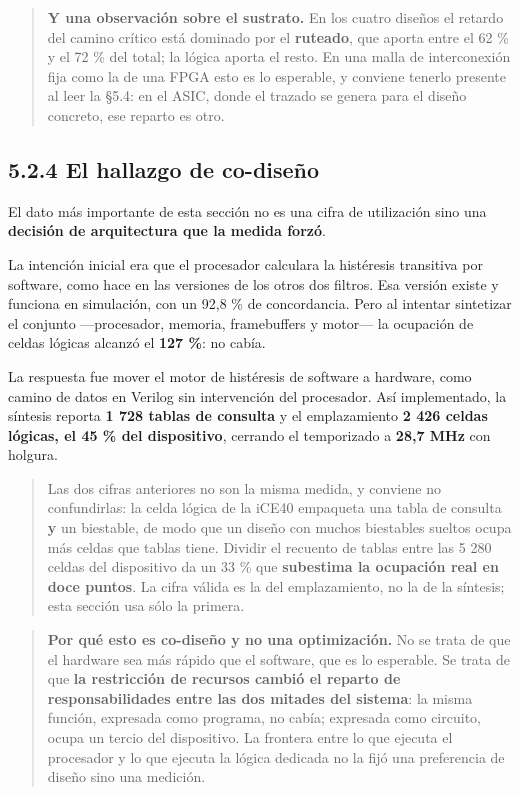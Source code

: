\begin{quote}
\textbf{Y una observación sobre el sustrato.} En los cuatro diseños el
retardo del camino crítico está dominado por el \textbf{ruteado}, que
aporta entre el 62 \% y el 72 \% del total; la lógica aporta el resto.
En una malla de interconexión fija como la de una FPGA esto es lo
esperable, y conviene tenerlo presente al leer la §5.4: en el ASIC,
donde el trazado se genera para el diseño concreto, ese reparto es otro.
\end{quote}

\subsection{5.2.4 El hallazgo de
co-diseño}\label{el-hallazgo-de-co-diseuxf1o}

El dato más importante de esta sección no es una cifra de utilización
sino una \textbf{decisión de arquitectura que la medida forzó}.

La intención inicial era que el procesador calculara la histéresis
transitiva por software, como hace en las versiones de los otros dos
filtros. Esa versión existe y funciona en simulación, con un 92,8 \% de
concordancia. Pero al intentar sintetizar el conjunto ---procesador,
memoria, framebuffers y motor--- la ocupación de celdas lógicas alcanzó
el \textbf{127 \%}: no cabía.

La respuesta fue mover el motor de histéresis de software a hardware,
como camino de datos en Verilog sin intervención del procesador. Así
implementado, la síntesis reporta \textbf{1 728 tablas de consulta} y el
emplazamiento \textbf{2 426 celdas lógicas, el 45 \% del dispositivo},
cerrando el temporizado a \textbf{28,7 MHz} con holgura.

\begin{quote}
Las dos cifras anteriores no son la misma medida, y conviene no
confundirlas: la celda lógica de la iCE40 empaqueta una tabla de
consulta \textbf{y} un biestable, de modo que un diseño con muchos
biestables sueltos ocupa más celdas que tablas tiene. Dividir el
recuento de tablas entre las 5 280 celdas del dispositivo da un 33 \%
que \textbf{subestima la ocupación real en doce puntos}. La cifra válida
es la del emplazamiento, no la de la síntesis; esta sección usa sólo la
primera.
\end{quote}

\begin{quote}
\textbf{Por qué esto es co-diseño y no una optimización.} No se trata de
que el hardware sea más rápido que el software, que es lo esperable. Se
trata de que \textbf{la restricción de recursos cambió el reparto de
responsabilidades entre las dos mitades del sistema}: la misma función,
expresada como programa, no cabía; expresada como circuito, ocupa un
tercio del dispositivo. La frontera entre lo que ejecuta el procesador y
lo que ejecuta la lógica dedicada no la fijó una preferencia de diseño
sino una medición.
\end{quote}

